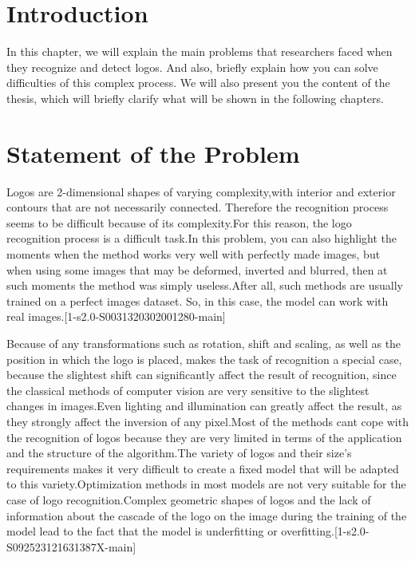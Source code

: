 \section{Introduction}\label{sec:2.1}
\vspace{-0.5cm}
\par In this chapter, we will explain the main problems that researchers faced when they recognize and detect logos. And also, briefly explain how you can solve difficulties of this complex process. We will also present you the content of the thesis, which will briefly clarify what will be shown in the following chapters.


\vspace{-0.3cm}


\section{Statement of the Problem}\label{sec:2.2}
\vspace{-0.5cm}
\par  Logos are 2-dimensional shapes of varying complexity,with interior and exterior contours that are not necessarily connected. Therefore the recognition process seems to be difficult because of its complexity.For this reason, the logo recognition process is a difficult task.In this problem, you can also highlight the moments when the method works very well with perfectly made images, but when using some images that may be deformed, inverted and blurred, then at such moments the method was simply useless.After all, such methods are usually trained on a perfect images dataset. So, in this case, the model can work with real images.[1-s2.0-S0031320302001280-main]
 

\vspace{-0.5cm}
\par Because of any transformations such as rotation, shift and scaling, as well as the position in which the logo is placed, makes the task of recognition a special case, because the slightest shift can significantly affect the result of recognition, since the classical methods of computer vision are very sensitive to the slightest changes in images.Even lighting and illumination can greatly affect the result, as they strongly affect the inversion of any pixel.Most of the methods cant cope with the recognition of logos because they are very limited in terms of the application and the structure of the algorithm.The variety of logos and their size's requirements makes it very difficult to create a fixed model that will be adapted to this variety.Optimization methods in most models are not very suitable for the case of logo recognition.Complex geometric shapes of logos and the lack of information about the cascade of the logo on the image during the training of the model lead to the fact that the model is underfitting or overfitting.[1-s2.0-S092523121631387X-main]

